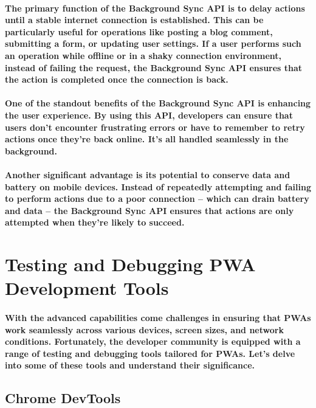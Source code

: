 \documentclass[12pt,a4paper]{article}
\begin{document}
    \paragraph{The primary function of the Background Sync API is to delay actions until a stable internet connection is established. This can be particularly useful for operations like posting a blog comment, submitting a form, or updating user settings. If a user performs such an operation while offline or in a shaky connection environment, instead of failing the request, the Background Sync API ensures that the action is completed once the connection is back.}
    
    \paragraph{One of the standout benefits of the Background Sync API is enhancing the user experience. By using this API, developers can ensure that users don’t encounter frustrating errors or have to remember to retry actions once they’re back online. It’s all handled seamlessly in the background.}
    
    \paragraph{Another significant advantage is its potential to conserve data and battery on mobile devices. Instead of repeatedly attempting and failing to perform actions due to a poor connection – which can drain battery and data – the Background Sync API ensures that actions are only attempted when they’re likely to succeed.}

    \section{Testing and Debugging PWA Development Tools}

    \paragraph{With the advanced capabilities come challenges in ensuring that PWAs work seamlessly across various devices, screen sizes, and network conditions. Fortunately, the developer community is equipped with a range of testing and debugging tools tailored for PWAs. Let’s delve into some of these tools and understand their significance.}

    \subsection{Chrome DevTools}
\end{document}
